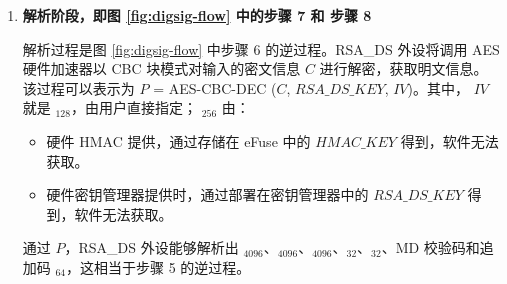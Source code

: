 \documentclass[main\_\_CN.tex]{subfiles}
\begin{document}
\begin{enumerate}

    \item {\bfseries 解析阶段，即图 \ref{fig:digsig-flow} 中的步骤 7 和 步骤 8}

        解析过程是图 \ref{fig:digsig-flow} 中步骤 6 的逆过程。RSA\_DS 外设将调用 AES 硬件加速器以 CBC 块模式对输入的密文信息 \begin{math}C\end{math} 进行解密，获取明文信息。
        该过程可以表示为
        \begin{math}P\end{math} = AES-CBC-DEC (\begin{math}C\end{math}, \begin{math}RSA\_DS\_KEY\end{math}, \begin{math}IV\end{math})。其中， \begin{math}IV\end{math} 就是 \begin{math}[IV]_{128}\end{math}，由用户直接指定； \begin{math}[RSA\_DS\_KEY]_{256}\end{math} 由：
        \begin{itemize}
            \item 硬件 HMAC 提供，通过存储在 eFuse 中的 \begin{math}HMAC\_KEY\end{math} 得到，软件无法获取。
            \item 硬件密钥管理器提供时，通过部署在密钥管理器中的 \begin{math}RSA\_DS\_KEY\end{math} 得到，软件无法获取。
        \end{itemize}
        通过 \begin{math}P\end{math}，RSA\_DS 外设能够解析出 \begin{math}[Y]_{4096}\end{math}、\begin{math}[M]_{4096}\end{math}、\begin{math}[\overline{r}]_{4096}\end{math}、\begin{math}[M^{\prime}]_{32}\end{math}、\begin{math}[L]_{32}\end{math}、MD 校验码和追加码 \begin{math}[\beta]_{64} \end{math}，这相当于步骤 5 的逆过程。


\end{enumerate}
\end{document}
